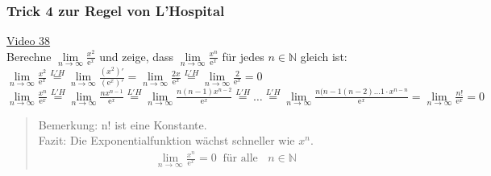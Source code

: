 \subsubsection{Trick 4 zur Regel von L’Hospital}
\href{https://youtu.be/moiaqTqBnkI}{Video 38 }\\
Berechne $ \lim\limits_ {n\to\infty}\frac{x^2}{\mathrm{e}^x} $ und zeige, dass $ \lim\limits_ {n\to\infty}\frac{x^n}{\mathrm{e}^x} $ für jedes $ n\in \mathbb{N} $ gleich ist:\vspace*{4mm}\\
\textbullet \;\;$\lim\limits_ {n\to\infty}\frac{x^2}{\mathrm{e}^x}\overset{L'H}{=}\lim\limits_ {n\to\infty}\frac{(x^2)'}{(\mathrm{e}^x)'}=\lim\limits_ {n\to\infty}\frac{2x}{\mathrm{e}^x}\overset{L'H}{=}\lim\limits_ {n\to\infty}\frac{2}{\mathrm{e}^x}=0$\vspace*{4mm}\\
\textbullet\;\;$\lim\limits_ {n\to\infty}\frac{x^n}{\mathrm{e}^x}\overset{L'H}{=}\lim\limits_ {n\to\infty}\frac{nx^{n-1}}{\mathrm{e}^x}\overset{L'H}{=}\lim\limits_ {n\to\infty}\frac{n(n-1)x^{n-2}}{\mathrm{e}^x}\overset{L'H}{=}\dots\overset{L'H}{=}\lim\limits_ {n\to\infty}\frac{n(n-1(n-2)\dots 1\cdot x^{n-n}}{\mathrm{e}^x}=\lim\limits_ {n\to\infty}\frac{n!}{\mathrm{e}^x}=0$\\
\begin{quote}
	Bemerkung: n! ist eine Konstante.\\
	Fazit: Die Exponentialfunktion wächst schneller wie $ x^n $.\\
	\begin{align*}
	\lim\limits_ {n\to\infty}\frac{x^n}{\mathrm{e}^x}=0\;\;\text{für alle }\;\; n\in \mathbb{N} 
	\end{align*}
\end{quote}

